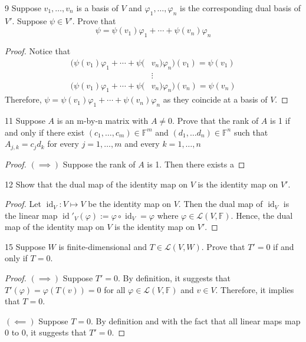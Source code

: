 \documentclass{article}
\newenvironment{problem}[1]{\begin{prob*}{#1}{}}{\end{prob*}}
\DeclareMathOperator{\id}{id}
\begin{document}
\begin{problem}{9}
Suppose $v_1, \ldots ,v_n$ is a basis of $V$ and $\varphi_1, \ldots , \varphi_n$ is the corresponding dual basis of $V'$. Suppose $\psi \in V'$. Prove that \[
	\psi = \psi(v_1)\varphi_1 + \cdots + \psi(v_n)\varphi_n\]
\end{problem}
\begin{proof}
	Notice that
	\begin{align*}
		(\psi(v_1)\varphi_1 + \cdots + \psi( & v_n)\varphi_n)(v_1) = \psi(v_1) \\
		                                     & \vdots                          \\
		(\psi(v_1)\varphi_1 + \cdots + \psi( & v_n)\varphi_n)(v_n) = \psi(v_n)
	\end{align*}
	Therefore, $\psi = \psi(v_1)\varphi_1 + \cdots + \psi(v_n)\varphi_n$ as they coincide at a basis of $V$.
\end{proof}
\begin{problem}{11}
Suppose $A $ is an m-by-n matrix with $A \neq 0$. Prove that the rank of $A$ is 1 if and only if there exist $(c_1, \ldots ,c_m) \in \mathbb{F}^m$ and $(d_1, \ldots d_n) \in \mathbb{F}^n$ such that $A_{j,k} = c_{j}d_{k}$ for every $j = 1, \ldots ,m$ and every $k = 1, \ldots ,n$
\end{problem}
\begin{proof}
	\begin{comment}
	TODO: 3.G.11 Pending.
	\end{comment}
	$(\implies)$ Suppose the rank of $A$ is 1. Then there exists a
\end{proof}

\begin{problem}{12}
Show that the dual map of the identity map on $V$ is the identity map on $V'$.
\end{problem}
\begin{proof}
	Let $\id_V : V \mapsto V$ be the identity map on $V$. Then the dual map of $\id_V$ is the linear map $\id'_{V}(\varphi) := \varphi \circ \id_V = \varphi$ where $\varphi \in \mathcal{L}(V, \mathbb{F})$. Hence, the dual map of the identity map on $V$ is the identity map on $V'$.
\end{proof}

\begin{problem}{15}
Suppose $W$ is finite-dimensional and $T \in \mathcal{L}(V,W)$. Prove that $T' = 0$ if and only if $T = 0$.
\end{problem}
\begin{proof}
	$(\implies)$ Suppose $T' = 0$. By definition, it suggests that $T'(\varphi) = \varphi(T(v)) = 0$ for all $\varphi \in \mathcal{L}(V,\mathbb{F})$ and $v \in V$. Therefore, it implies that $T = 0$. \par
	$(\impliedby)$ Suppose $T = 0$. By definition and with the fact that all linear maps map 0 to 0, it suggests that $T' = 0$.
\end{proof}
\end{document}
